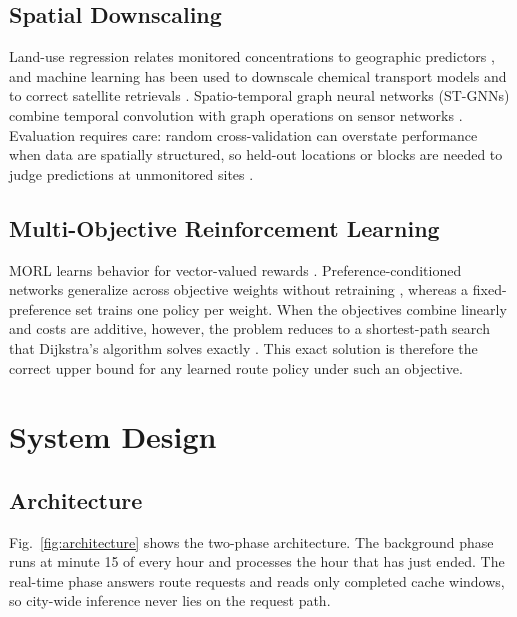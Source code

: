 \documentclass[conference]{IEEEtran}
\begin{document}
\subsection{Spatial Downscaling}

Land-use regression relates monitored concentrations to geographic predictors \cite{hoek2008}, and machine learning has been used to downscale chemical transport models \cite{gouldsbrough2024} and to correct satellite retrievals \cite{porcheddu2024}. Spatio-temporal graph neural networks (ST-GNNs) combine temporal convolution with graph operations on sensor networks \cite{yu2018}. Evaluation requires care: random cross-validation can overstate performance when data are spatially structured, so held-out locations or blocks are needed to judge predictions at unmonitored sites \cite{roberts2017,meyer2022}.

\subsection{Multi-Objective Reinforcement Learning}

MORL learns behavior for vector-valued rewards \cite{roijers2013,hayes2022}. Preference-conditioned networks generalize across objective weights without retraining \cite{abels2019,yang2019}, whereas a fixed-preference set trains one policy per weight. When the objectives combine linearly and costs are additive, however, the problem reduces to a shortest-path search that Dijkstra's algorithm solves exactly \cite{dijkstra1959}. This exact solution is therefore the correct upper bound for any learned route policy under such an objective.

\section{System Design}

\subsection{Architecture}

Fig.~\ref{fig:architecture} shows the two-phase architecture. The background phase runs at minute 15 of every hour and processes the hour that has just ended. The real-time phase answers route requests and reads only completed cache windows, so city-wide inference never lies on the request path.
\end{document}
